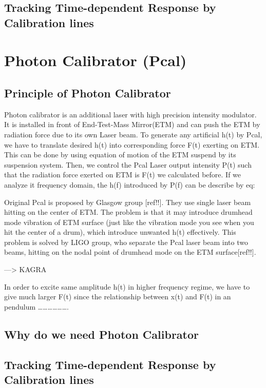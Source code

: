 \subsection{Tracking Time-dependent Response by Calibration lines}



\section{Photon Calibrator (Pcal)}
\subsection{Principle of Photon Calibrator}
Photon calibrator is an additional laser with high precision intensity modulator. It is installed in front of End-Test-Mass Mirror(ETM) and can push the ETM by radiation force due to its own Laser beam. To generate any artificial h(t) by Pcal, we have to translate desired h(t) into corresponding force F(t) exerting on ETM. This can be done by using equation of motion of the ETM suspend by its suspension system. Then, we control the Pcal Laser output intensity P(t) such that the radiation force exerted on ETM is F(t) we calculated before. If we analyze it frequency domain,  the h(f) introduced by P(f) can be describe by eq:

Original Pcal is proposed by Glasgow group [ref!!]. They use single laser beam hitting on the center of ETM. The problem is that it may introduce drumhead mode vibration of ETM surface (just like the vibration mode you see when you hit the center of a drum), which introduce unwanted h(t) effectively. This problem is solved by LIGO group, who separate the Pcal laser beam into two beams, hitting on the nodal point of drumhead mode on the ETM surface[ref!!].  

 —> KAGRA

In order to excite same amplitude h(t) in higher frequency regime, we have to give much larger F(t) since the relationship between x(t) and F(t) in an pendulum ……………….



\subsection{Why do we need Photon Calibrator}
\subsection{Tracking Time-dependent Response by Calibration lines}
